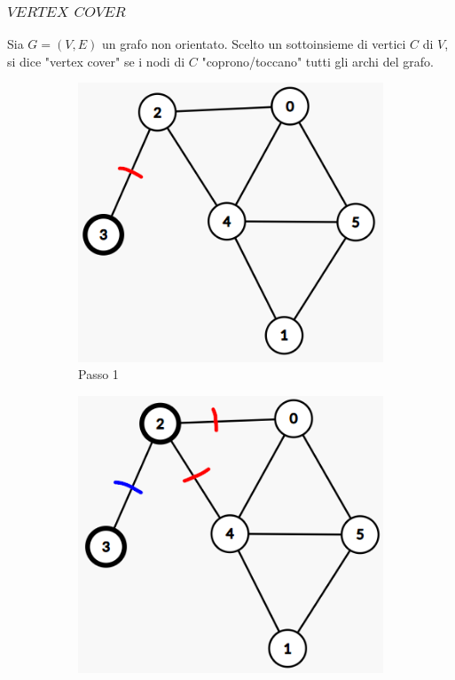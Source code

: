 \documentclass{article}  %
\theoremstyle{definition}
\begin{document}
\subsubsection{$VERTEX$ $COVER$}
Sia $G=(V,E)$ un grafo non orientato. Scelto un sottoinsieme di vertici $C$ di $V$, si dice "vertex cover" se i nodi di $C$ "coprono/toccano" tutti gli archi del grafo.
\begin{figure}[h]
	\centering
	\begin{subfigure}[b]{0.24\textwidth}
		\centering
		\includegraphics[width=\textwidth]{vc1.png}
		\caption{Passo 1}
	\end{subfigure}
	\hfill
	\begin{subfigure}[b]{0.24\textwidth}
		\centering
		\includegraphics[width=\textwidth]{vc2.png}

\end{subfigure}
\end{figure}
\end{document}
